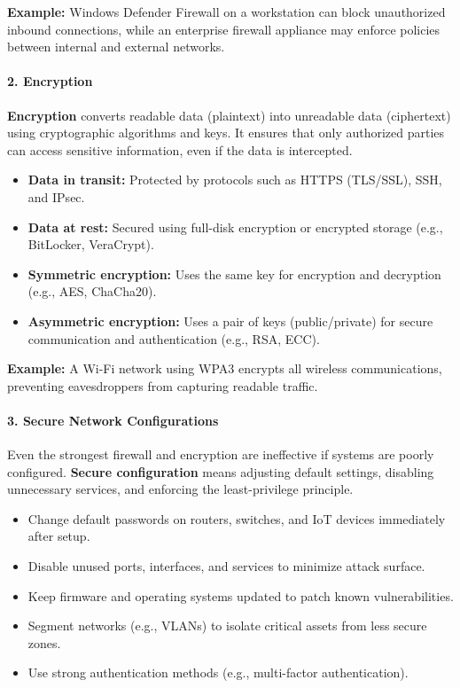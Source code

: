 \documentclass[12pt,a4paper]{report}
\begin{document}
\textbf{Example:} Windows Defender Firewall on a workstation can block unauthorized inbound connections, 
while an enterprise firewall appliance may enforce policies between internal and external networks.

\paragraph{2. Encryption}
\textbf{Encryption} converts readable data (plaintext) into unreadable data (ciphertext) using cryptographic algorithms and keys. 
It ensures that only authorized parties can access sensitive information, even if the data is intercepted.

\begin{itemize}
  \item \textbf{Data in transit:} Protected by protocols such as HTTPS (TLS/SSL), SSH, and IPsec. 
  \item \textbf{Data at rest:} Secured using full-disk encryption or encrypted storage (e.g., BitLocker, VeraCrypt).
  \item \textbf{Symmetric encryption:} Uses the same key for encryption and decryption (e.g., AES, ChaCha20).
  \item \textbf{Asymmetric encryption:} Uses a pair of keys (public/private) for secure communication and authentication (e.g., RSA, ECC).
\end{itemize}

\textbf{Example:} A Wi-Fi network using WPA3 encrypts all wireless communications, 
preventing eavesdroppers from capturing readable traffic.

\paragraph{3. Secure Network Configurations}
Even the strongest firewall and encryption are ineffective if systems are poorly configured. 
\textbf{Secure configuration} means adjusting default settings, disabling unnecessary services, and enforcing the least-privilege principle.

\begin{itemize}
  \item Change default passwords on routers, switches, and IoT devices immediately after setup.
  \item Disable unused ports, interfaces, and services to minimize attack surface.
  \item Keep firmware and operating systems updated to patch known vulnerabilities.
  \item Segment networks (e.g., VLANs) to isolate critical assets from less secure zones.
  \item Use strong authentication methods (e.g., multi-factor authentication).
\end{itemize}
\end{document}
